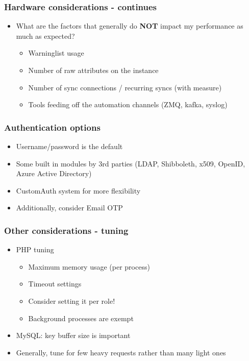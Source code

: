 \begin{frame}
\frametitle{Hardware considerations - continues}
    \begin{itemize}
        \item What are the factors that generally do {\bf NOT} impact my performance as much as expected?
        \begin{itemize}
            \item Warninglist usage
            \item Number of raw attributes on the instance
            \item Number of sync connections / recurring syncs (with measure)
            \item Tools feeding off the automation channels (ZMQ, kafka, syslog)
        \end{itemize}
    \end{itemize}
\end{frame}

\begin{frame}
\frametitle{Authentication options}
    \begin{itemize}
        \item Username/password is the default
        \item Some built in modules by 3rd parties (LDAP, Shibboleth, x509, OpenID, Azure Active Directory)
        \item CustomAuth system for more flexibility
        \item Additionally, consider Email OTP
    \end{itemize}
\end{frame}

\begin{frame}
\frametitle{Other considerations - tuning}
    \begin{itemize}
        \item PHP tuning
        \begin{itemize}
            \item Maximum memory usage (per process)
            \item Timeout settings
            \item Consider setting it per role!
            \item Background processes are exempt
        \end{itemize}
        \item MySQL: key buffer size is important
        \item Generally, tune for few heavy requests rather than many light ones
    \end{itemize}
\end{frame}

